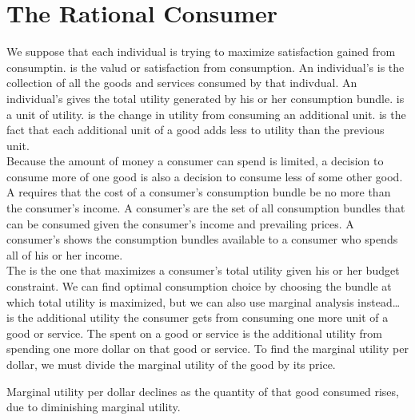 \documentclass{article}
\begin{document}
\section{The Rational Consumer}

We suppose that each individual is trying to maximize satisfaction gained from consumptin.  is the valud or satisfaction from consumption. An individual's  is the collection of all the goods and services consumed by that indivdual. An individual's  gives the total utility generated by his or her consumption bundle.  is a unit of utility.  is the change in utility from consuming an additional unit.  is the fact that each additional unit of a good adds less to utility than the previous unit. \\ 

Because the amount of money a consumer can spend is limited, a decision to consume more of one good is also a decision to consume less of some other good. A  requires that the cost of a consumer's consumption bundle be no more than the consumer's income. A consumer's  are the set of all consumption bundles that can be consumed given the consumer's income and prevailing prices. A consumer's  shows the consumption bundles available to a consumer who spends all of his or her income. \\

The  is the one that maximizes a consumer's total utility given his or her budget constraint. We can find optimal consumption choice by choosing the bundle at which total utility is maximized, but we can also use marginal analysis instead\dots \\ 

 is the additional utility the consumer gets from consuming one more unit of a good or service. The  spent on a good or service is the additional utility from spending one more dollar on that good or service. To find the marginal utility per dollar, we must divide the marginal utility of the good by its price. 

\begin{remark}
  Marginal utility per dollar declines as the quantity of that good consumed rises, due to diminishing marginal utility.
\end{remark}
\end{document}
